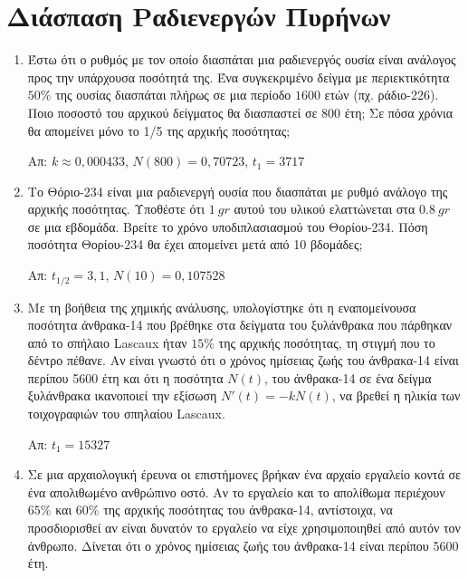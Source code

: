 \section*{Διάσπαση Ραδιενεργών Πυρήνων}

\begin{enumerate}
  \item Έστω ότι ο ρυθμός με τον οποίο διασπάται μια ραδιενεργός ουσία είναι ανάλογος 
    προς την υπάρχουσα ποσότητά της. Ένα συγκεκριμένο δείγμα με περιεκτικότητα $ 50 \% $ 
    της ουσίας διασπάται πλήρως σε μια περίοδο $ 1600 $ ετών (πχ. ράδιο-226). Ποιο 
    ποσοστό του αρχικού δείγματος θα διασπαστεί σε $ 800 $ έτη; Σε πόσα χρόνια 
    θα απομείνει μόνο το 1/5 της αρχικής ποσότητας; 

    \hfill Απ: $ k\approx 0,000433 $, $ N(800) = 0,70723 $, $ t_{1}=3717 $ 


  \item Το Θόριο-234 είναι μια ραδιενεργή ουσία που διασπάται με ρυθμό ανάλογο της 
    αρχικής ποσότητας. Υποθέστε ότι $ \SI{1}{gr} $ αυτού του υλικού ελαττώνεται στα 
    $ \SI{0,8}{gr} $ σε μια εβδομάδα. Βρείτε το χρόνο υποδιπλασιασμού του Θορίου-234. 
    Πόση ποσότητα Θορίου-234 θα έχει απομείνει μετά από 10 βδομάδες;

    \hfill Απ: $ t_{1/2} = 3,1$, $ N(10)=0,107528 $  

  \item Με τη βοήθεια της χημικής ανάλυσης, υπολογίστηκε ότι η εναπομείνουσα ποσότητα 
    άνθρακα-14 που βρέθηκε στα δείγματα του ξυλάνθρακα που πάρθηκαν από το σπήλαιο 
    Lascaux ήταν $ 15 \% $ της αρχικής ποσότητας, τη στιγμή που το δέντρο πέθανε. Αν 
    είναι γνωστό ότι ο χρόνος ημίσειας ζωής του άνθρακα-14 είναι περίπου 5600 έτη και 
    ότι η ποσότητα $ N(t) $, του άνθρακα-14 σε ένα δείγμα ξυλάνθρακα ικανοποιεί την 
    εξίσωση $ N'(t)=-kN(t) $, να βρεθεί η ηλικία των τοιχογραφιών του σπηλαίου Lascaux.

    \hfill Απ: $ t_{1} = 15327 $ 

  \item Σε μια αρχαιολογική έρευνα οι επιστήμονες βρήκαν ένα αρχαίο εργαλείο κοντά 
    σε ένα απολιθωμένο ανθρώπινο οστό. Αν το εργαλείο και το απολίθωμα περιέχουν 
    $ 65 \% $ και $ 60 \% $ της αρχικής ποσότητας του άνθρακα-14, αντίστοιχα, 
    να προσδιορισθεί αν είναι δυνατόν το εργαλείο να είχε χρησιμοποιηθεί από αυτόν 
    τον άνθρωπο.  Δίνεται ότι ο χρόνος ημίσειας ζωής του άνθρακα-14 είναι περίπου 
    5600 έτη.  


\end{enumerate}
